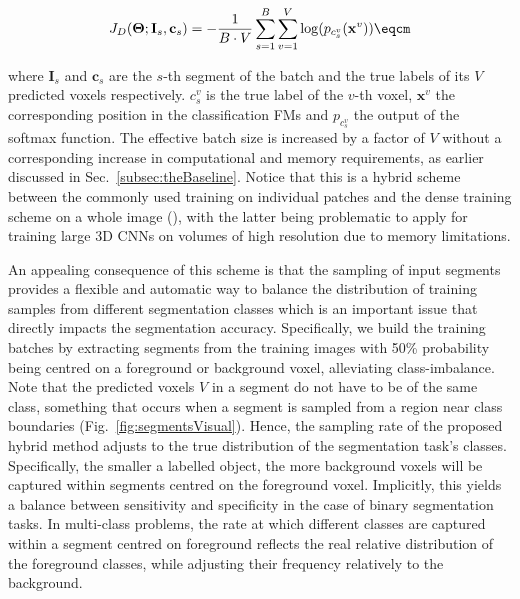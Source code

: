 \begin{equation} \label{eq:costDense}
J_D(\mathbf{\Theta}; \mathbf{I}_s, \mathbf{c}_s) = - \frac{1}{B \cdot V} \sum_{s=1}^{B} \sum_{v=1}^{V} \log( p_{c_s^v}(\mathbf{x}^v)) \eqcm
\end{equation}

where $\mathbf{I}_s$ and $\mathbf{c}_s$ are the $s$-th segment of the batch and the true labels of its $V$ predicted voxels respectively. $c_s^v$ is the true label of the $v$-th voxel, $\mathbf{x}^v$ the corresponding position in the classification FMs and $p_{c_s^v}$ the output of the softmax function. The effective batch size is increased by a factor of $V$ without a corresponding increase in computational and memory requirements, as earlier discussed in Sec.~\ref{subsec:theBaseline}. Notice that this is a hybrid scheme between the commonly used training on individual patches and the dense training scheme on a whole image (\cite{Long2014}), with the latter being problematic to apply for training large 3D CNNs on volumes of high resolution due to memory limitations.





An appealing consequence of this scheme is that the sampling of input segments provides a flexible and automatic way to balance the distribution of training samples from different segmentation classes which is an important issue that directly impacts the segmentation accuracy. Specifically, we build the training batches by extracting segments from the training images with 50\% probability being centred on a foreground or background voxel, alleviating class-imbalance. Note that the predicted voxels $V$ in a segment do not have to be of the same class, something that occurs when a segment is sampled from a region near class boundaries (Fig.~\ref{fig:segmentsVisual}). Hence, the sampling rate of the proposed hybrid method adjusts to the true distribution of the segmentation task's classes. Specifically, the smaller a labelled object, the more background voxels will be captured within segments centred on the foreground voxel. Implicitly, this yields a balance between sensitivity and specificity in the case of binary segmentation tasks. In multi-class problems, the rate at which different classes are captured within a segment centred on foreground reflects the real relative distribution of the foreground classes, while adjusting their frequency relatively to the background.

